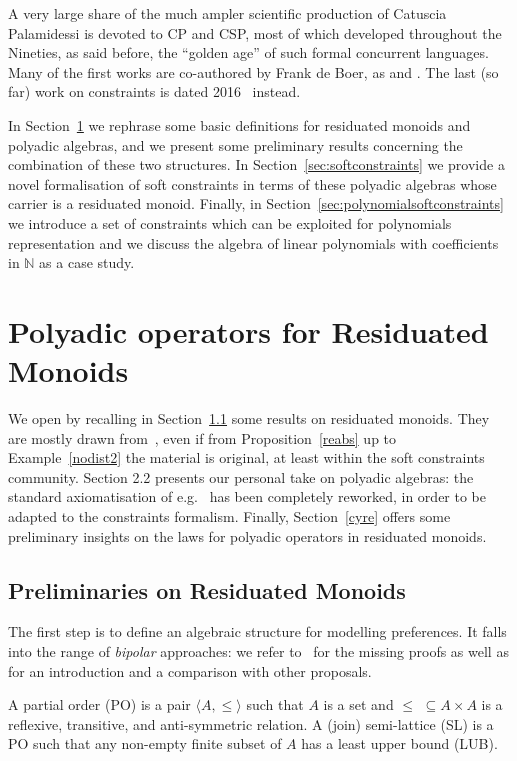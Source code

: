 \documentclass{llncs}
\begin{document}
A very large share of the much ampler scientific production of Catuscia Palamidessi is devoted to CP and CSP, most of which developed throughout the Nineties, as said before, the ``golden age'' of such formal concurrent languages. Many of the first works are co-authored by Frank de Boer, as \cite{boer2} and \cite{boer1}. The last (so far) work on constraints is  dated 2016~\cite{last} instead.


In Section~\ref{sec:bg} we rephrase some basic definitions for residuated monoids and polyadic algebras, and we present some preliminary results concerning the combination of 
these two structures.
%
In Section~\ref{sec:softconstraints} we provide a novel formalisation of soft constraints in terms of these polyadic algebras whose carrier is a residuated monoid. 
%
Finally, in Section~\ref{sec:polynomialsoftconstraints} we introduce a set of constraints which can be exploited for polynomials representation 
and we discuss the algebra of linear polynomials with coefficients in $\mathbb{N}$ as a case study.

\section{Polyadic operators for Residuated Monoids}\label{sec:bg}

We open by recalling in Section~\ref{sec:lem} some results on residuated monoids.
%
They are mostly drawn from~\cite{jlamp17}, even if from Proposition~\ref{reabs}
up to Example~\ref{nodist2} the material is original, at least within the
soft constraints community.
%
Section 2.2 presents our personal take on polyadic algebras:
the standard axiomatisation of e.g.~\cite{sagi2013} has been completely 
reworked, in order 
to be adapted to the constraints formalism.
%
Finally, Section~\ref{cyre} offers some preliminary insights on 
the laws for polyadic operators in residuated monoids.

\subsection{Preliminaries on Residuated Monoids}\label{sec:lem}

The first step is to define an algebraic structure for modelling preferences. 
It falls into the range of \emph{bipolar} approaches: we refer to~\cite{ipl17} 
for the missing proofs as well as for an introduction and a comparison with other proposals.

\begin{definition}[orders]
	A partial order (PO) is a pair $\langle A, \leq \rangle$ such that
	$A$ is a set %
	and $\leq \,\,\subseteq A \times A$ is a reflexive, transitive, and
	anti-symmetric  relation.
	A (join) semi-lattice (SL) is a PO such that any non-empty finite  subset of $A$ has a
	least upper bound (LUB).
\end{definition}
\end{document}
